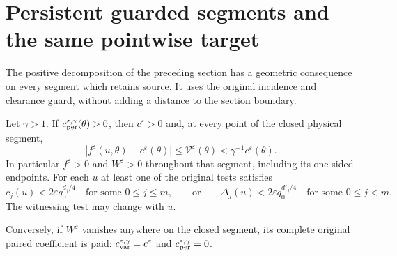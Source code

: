 \section{Persistent guarded segments and the same pointwise target}
\label{sec:v110-persistence}
The positive decomposition of the preceding section has a geometric
consequence on every segment which retains source. It uses the
original incidence and clearance guard, without adding a distance
to the section boundary.

\begin{theorem}
\label{thm:v110-persistence}
Let $\gamma>1$. If $c_{\rm per}^{\varepsilon,\gamma}(\theta)>0$,
then $c^\varepsilon>0$ and, at every point of the closed physical
segment,
\begin{equation}\label{eq:v110-near-constant}
 |f^\varepsilon(u,\theta)-c^\varepsilon(\theta)|
       \le\mathcal V^\varepsilon(\theta)
       <\gamma^{-1}c^\varepsilon(\theta).
\end{equation}
In particular $f^\varepsilon>0$ and $W^\varepsilon>0$ throughout
that segment, including its one-sided endpoints. For each $u$ at
least one of the original tests satisfies
\begin{equation}\label{eq:v110-witness}
 c_j(u)<2\varepsilon q_0^{d_j/4}
       \quad\text{for some }0\le j\le m,
 \qquad\text{or}\qquad
 \Delta_j(u)<2\varepsilon q_0^{d'_j/4}
       \quad\text{for some }0\le j<m.
\end{equation}
The witnessing test may change with $u$.

Conversely, if $W^\varepsilon$ vanishes anywhere on the closed
segment, its complete original paired coefficient is paid:
$c_{\rm var}^{\varepsilon,\gamma}=c^\varepsilon$ and
$c_{\rm per}^{\varepsilon,\gamma}=0$.
\end{theorem}
